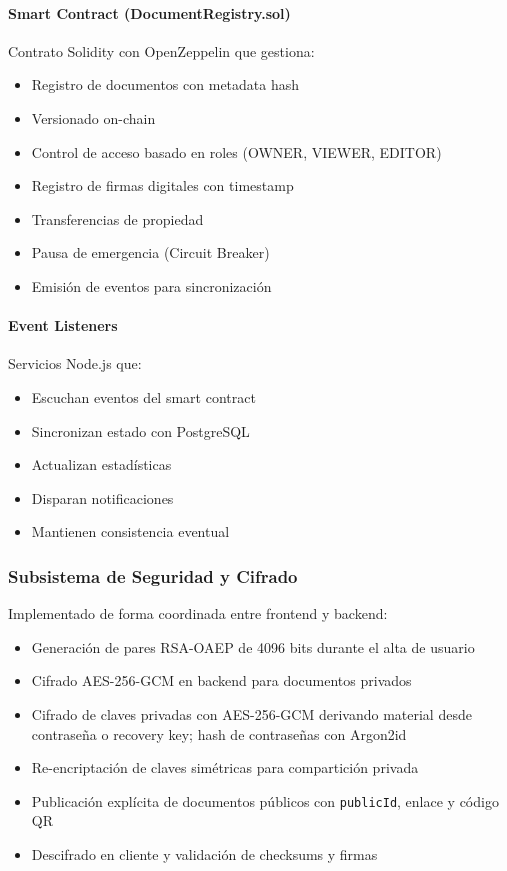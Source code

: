 \documentclass[11pt, a4paper]{article}
\begin{document}
\paragraph{Smart Contract (DocumentRegistry.sol)}
Contrato Solidity con OpenZeppelin que gestiona:
\begin{itemize}
    \item Registro de documentos con metadata hash
    \item Versionado on-chain
    \item Control de acceso basado en roles (OWNER, VIEWER, EDITOR)
    \item Registro de firmas digitales con timestamp
    \item Transferencias de propiedad
    \item Pausa de emergencia (Circuit Breaker)
    \item Emisión de eventos para sincronización
\end{itemize}

\paragraph{Event Listeners}
Servicios Node.js que:
\begin{itemize}
    \item Escuchan eventos del smart contract
    \item Sincronizan estado con PostgreSQL
    \item Actualizan estadísticas
    \item Disparan notificaciones
    \item Mantienen consistencia eventual
\end{itemize}

\subsubsection{Subsistema de Seguridad y Cifrado}

Implementado de forma coordinada entre frontend y backend:

\begin{itemize}
    \item Generación de pares RSA-OAEP de 4096 bits durante el alta de usuario
    \item Cifrado AES-256-GCM en backend para documentos privados
    \item Cifrado de claves privadas con AES-256-GCM derivando material desde contraseña o recovery key; hash de contraseñas con Argon2id
    \item Re-encriptación de claves simétricas para compartición privada
    \item Publicación explícita de documentos públicos con \texttt{publicId}, enlace y código QR
    \item Descifrado en cliente y validación de checksums y firmas
\end{itemize}
\end{document}
